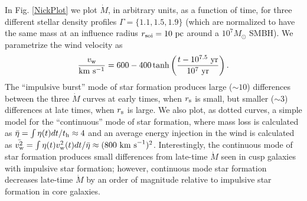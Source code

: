 \documentclass[usenatbib,fleqn]{mn2e}
\begin{document}
In Fig. \ref{NickPlot} we plot $\dot{M}$, in arbitrary units, as a function of time, for three different stellar density profiles $\Gamma = \{1.1, 1.5, 1.9\}$ (which are normalized to have the same mass at an influence radius $r_{\rm soi}=10~{\rm pc}$ around a $10^7M_\odot$ SMBH).  We parametrize the wind velocity as 
\begin{equation}
\frac{v_{\rm w}}{\rm km~s^{-1}}=600-400\tanh\left( \frac{t-10^{7.5}~{\rm yr}}{10^{7}~{\rm yr}}\right).
\end{equation}
The ``impulsive burst'' mode of star formation produces large ($\sim 10$) differences between the three $\dot{M}$ curves at early times, when $r_{\rm s}$ is small, but smaller ($\sim 3$) differences at late times, when $r_{\rm s}$ is large.  We also plot, as dotted curves, a simple model for the ``continuous'' mode of star formation, where mass loss is calculated as $\bar{\eta} = \int\eta(t)dt/t_{\rm h} \approx 4$ and an average energy injection in the wind is calculated as $\bar{v_{\rm w}^2}=\int\eta(t)v_{\rm w}^2(t)dt/\bar{\eta} \approx (800~{\rm km~s}^{-1})^2$.  Interestingly, the continuous mode of star formation produces small differences from late-time $\dot{M}$ seen in cusp galaxies with impulsive star formation; however, continuous mode star formation decreases late-time $\dot{M}$ by an order of magnitude relative to impulsive star formation in core galaxies.
  \footnotesize{
    
    
  }
\end{document}
